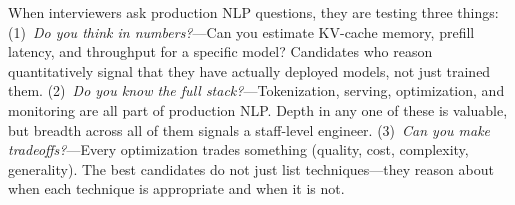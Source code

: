 \begin{keyinsight}
When interviewers ask production NLP questions, they are testing three things:
(1)~\emph{Do you think in numbers?}---Can you estimate KV-cache memory, prefill latency,
and throughput for a specific model?  Candidates who reason quantitatively signal that
they have actually deployed models, not just trained them.
(2)~\emph{Do you know the full stack?}---Tokenization, serving, optimization, and
monitoring are all part of production NLP.  Depth in any one of these is valuable, but
breadth across all of them signals a staff-level engineer.
(3)~\emph{Can you make tradeoffs?}---Every optimization trades something (quality, cost,
complexity, generality).  The best candidates do not just list techniques---they reason
about when each technique is appropriate and when it is not.
\end{keyinsight}
